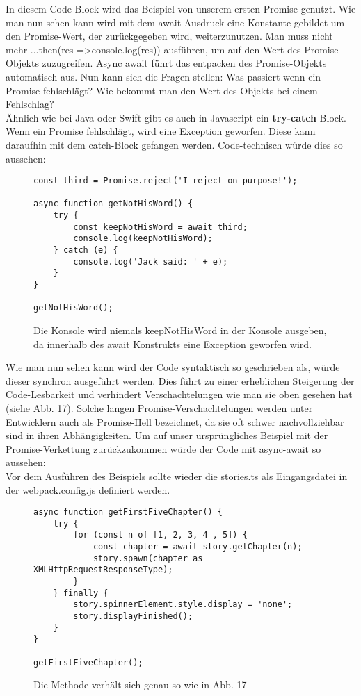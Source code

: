\noindent
In diesem Code-Block wird das Beispiel von unserem ersten Promise genutzt. Wie man nun sehen kann wird mit dem await Ausdruck eine Konstante gebildet um den Promise-Wert, der zurückgegeben wird, weiterzunutzen. Man muss nicht mehr ...then(res =\textgreater console.log(res)) ausführen, um auf den Wert des Promise-Objekts zuzugreifen. Async await führt das entpacken des Promise-Objekts automatisch aus. Nun kann sich die Fragen stellen: Was passiert wenn ein Promise fehlschlägt? Wie bekommt man den Wert des Objekts bei einem Fehlschlag? \\

\noindent
Ähnlich wie bei Java oder Swift gibt es auch in Javascript ein \textbf{try-catch}-Block. Wenn ein Promise fehlschlägt, wird eine Exception geworfen. Diese kann daraufhin mit dem catch-Block gefangen werden. Code-technisch würde dies so aussehen:

\begin{figure}[H]
\begin{lstlisting}
const third = Promise.reject('I reject on purpose!');

async function getNotHisWord() {
    try {
        const keepNotHisWord = await third;
        console.log(keepNotHisWord);
    } catch (e) {
        console.log('Jack said: ' + e);
    }
}

getNotHisWord();
\end{lstlisting}
\caption{Die Konsole wird niemals keepNotHisWord in der Konsole ausgeben, da innerhalb des await Konstrukts eine Exception geworfen wird.}
\end{figure}

\noindent
Wie man nun sehen kann wird der Code syntaktisch so geschrieben als, würde dieser synchron ausgeführt werden. Dies führt zu einer erheblichen Steigerung der Code-Lesbarkeit und verhindert Verschachtelungen wie man sie oben gesehen hat (siehe Abb. 17). Solche langen Promise-Verschachtelungen werden unter Entwicklern auch als \glqq{}Promise-Hell\grqq{} bezeichnet, da sie oft schwer nachvollziehbar sind in ihren Abhängigkeiten. Um auf unser ursprüngliches Beispiel mit der Promise-Verkettung zurückzukommen würde der Code mit async-await so aussehen:\\

\noindent
Vor dem Ausführen des Beispiels sollte wieder die stories.ts als Eingangsdatei in der webpack.config.js definiert werden.

\begin{figure}[H]
\begin{lstlisting}
async function getFirstFiveChapter() {
    try {
        for (const n of [1, 2, 3, 4 , 5]) {
            const chapter = await story.getChapter(n);
            story.spawn(chapter as XMLHttpRequestResponseType);
        }
    } finally {
        story.spinnerElement.style.display = 'none';
        story.displayFinished();
    }
}

getFirstFiveChapter();
\end{lstlisting}
\caption{Die Methode verhält sich genau so wie in Abb. 17}
\end{figure}

